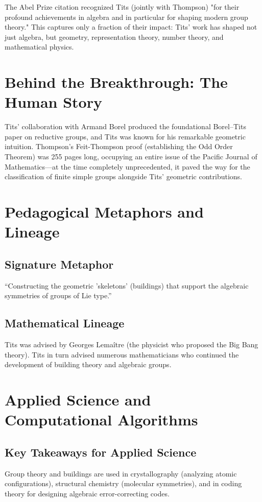 The Abel Prize citation recognized Tits (jointly with Thompson) "for their profound achievements in algebra and in particular for shaping modern group theory." This captures only a fraction of their impact: Tits' work has shaped not just algebra, but geometry, representation theory, number theory, and mathematical physics.

\section{Behind the Breakthrough: The Human Story}
Tits' collaboration with Armand Borel produced the foundational Borel--Tits paper on reductive groups, and Tits was known for his remarkable geometric intuition. Thompson's Feit-Thompson proof (establishing the Odd Order Theorem) was 255 pages long, occupying an entire issue of the Pacific Journal of Mathematics---at the time completely unprecedented, it paved the way for the classification of finite simple groups alongside Tits' geometric contributions.

\section{Pedagogical Metaphors and Lineage}
\subsection{Signature Metaphor}
``Constructing the geometric 'skeletons' (buildings) that support the algebraic symmetries of groups of Lie type.''

\subsection{Mathematical Lineage}
Tits was advised by Georges Lema\^itre (the physicist who proposed the Big Bang theory). Tits in turn advised numerous mathematicians who continued the development of building theory and algebraic groups.

\section{Applied Science and Computational Algorithms}
\subsection{Key Takeaways for Applied Science}
Group theory and buildings are used in crystallography (analyzing atomic configurations), structural chemistry (molecular symmetries), and in coding theory for designing algebraic error-correcting codes.

